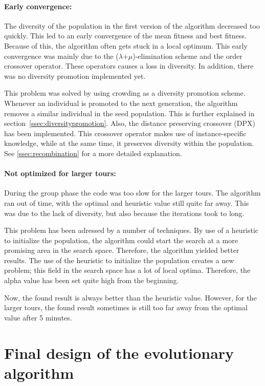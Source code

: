 \documentclass[a4paper,10pt]{article}
\begin{document}
\paragraph{Early convergence:} The diversity of the population in the first version of the algorithm decreased too quickly. This led to an early convergence of the mean fitness and best fitness. Because of this, the algorithm often gets stuck in a local optimum. This early convergence was mainly due to the ($\lambda$+$\mu$)-elimination scheme and the order crossover operator. These operators causes a loss in diversity. In addition, there was no diversity promotion implemented yet.

This problem was solved by using crowding as a diversity promotion scheme. Whenever an individual is promoted to the next generation, the algorithm removes a similar individual in the seed population. This is further explained in section~\ref{ssec:diversitypromotion}. Also, the distance preserving crossover (DPX) has been implemented. This crossover operator makes use of instance-specific knowledge, while at the same time, it preserves diversity within the population. See \ref{ssec:recombination} for a more detailed explanation. 

\paragraph{Not optimized for larger tours:} During the group phase the code was too slow for the larger tours. The algorithm ran out of time, with the optimal and heuristic value still quite far away. This was due to the lack of diversity, but also because the iterations took to long. 

This problem has been adressed by a number of techniques. By use of a heuristic to initialize the population, the algorithm could start the search at a more promising area in the search space. Therefore, the algorithm yielded better results. The use of the heuristic to initialize the population creates a new problem; this field in the search space has a lot of local optima. Therefore, the alpha value has been set quite high from the beginning. 

Now, the found result is always better than the heuristic value. However, for the larger tours, the found result sometimes is still too far away from the optimal value after 5 minutes. 

\section{Final design of the evolutionary algorithm}\label{sec:design} 
\end{document}
